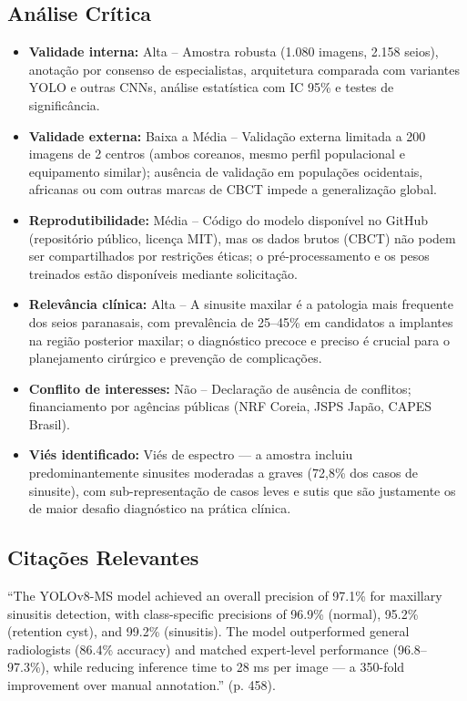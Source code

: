 \subsection{Análise Crítica}
\begin{itemize}
  \item \textbf{Validade interna:} Alta -- Amostra robusta (1.080
        imagens, 2.158 seios), anotação por consenso de especialistas,
        arquitetura comparada com variantes YOLO e outras CNNs,
        análise estatística com IC 95\% e testes de significância.
  \item \textbf{Validade externa:} Baixa a Média -- Validação externa
        limitada a 200 imagens de 2 centros (ambos coreanos, mesmo
        perfil populacional e equipamento similar); ausência de
        validação em populações ocidentais, africanas ou com outras
        marcas de CBCT impede a generalização global.
  \item \textbf{Reprodutibilidade:} Média -- Código do modelo
        disponível no GitHub (repositório público, licença MIT), mas
        os dados brutos (CBCT) não podem ser compartilhados por
        restrições éticas; o pré-processamento e os pesos treinados
        estão disponíveis mediante solicitação.
  \item \textbf{Relevância clínica:} Alta -- A sinusite maxilar é a
        patologia mais frequente dos seios paranasais, com prevalência
        de 25--45\% em candidatos a implantes na região posterior
        maxilar; o diagnóstico precoce e preciso é crucial para o
        planejamento cirúrgico e prevenção de complicações.
  \item \textbf{Conflito de interesses:} Não -- Declaração de ausência
        de conflitos; financiamento por agências públicas (NRF Coreia,
        JSPS Japão, CAPES Brasil).
  \item \textbf{Viés identificado:} Viés de espectro — a amostra
        incluiu predominantemente sinusites moderadas a graves
        (72,8\% dos casos de sinusite), com sub-representação de
        casos leves e sutis que são justamente os de maior desafio
        diagnóstico na prática clínica.
\end{itemize}

\subsection{Citações Relevantes}
\begin{citacao}
``The YOLOv8-MS model achieved an overall precision of 97.1\% for
maxillary sinusitis detection, with class-specific precisions of
96.9\% (normal), 95.2\% (retention cyst), and 99.2\% (sinusitis).
The model outperformed general radiologists (86.4\% accuracy) and
matched expert-level performance (96.8--97.3\%), while reducing
inference time to 28 ms per image — a 350-fold improvement over
manual annotation.'' (p. 458).
\end{citacao}

